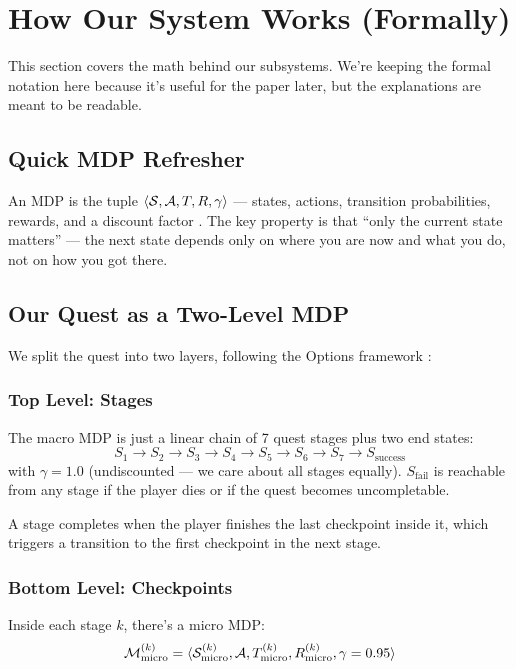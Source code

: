 \section{How Our System Works (Formally)}
\label{sec:problem_formulation}

This section covers the math behind our subsystems. We're keeping the formal notation here because it's useful for the paper later, but the explanations are meant to be readable.

\subsection{Quick MDP Refresher}

An MDP is the tuple $\langle \mathcal{S}, \mathcal{A}, T, R, \gamma \rangle$ --- states, actions, transition probabilities, rewards, and a discount factor \cite{bellman1957dynamic, puterman1994mdp}. The key property is that ``only the current state matters'' --- the next state depends only on where you are now and what you do, not on how you got there.

\subsection{Our Quest as a Two-Level MDP}

We split the quest into two layers, following the Options framework \cite{sutton1999options}:

\subsubsection{Top Level: Stages}

The macro MDP is just a linear chain of 7 quest stages plus two end states:
$$S_1 \to S_2 \to S_3 \to S_4 \to S_5 \to S_6 \to S_7 \to S_{\text{success}}$$
with $\gamma = 1.0$ (undiscounted --- we care about all stages equally). $S_{\text{fail}}$ is reachable from any stage if the player dies or if the quest becomes uncompletable.

A stage completes when the player finishes the last checkpoint inside it, which triggers a transition to the first checkpoint in the next stage.

\subsubsection{Bottom Level: Checkpoints}

Inside each stage $k$, there's a micro MDP:
$$\mathcal{M}_{\text{micro}}^{(k)} = \langle \mathcal{S}_{\text{micro}}^{(k)}, \mathcal{A}, T_{\text{micro}}^{(k)}, R_{\text{micro}}^{(k)}, \gamma = 0.95 \rangle$$

